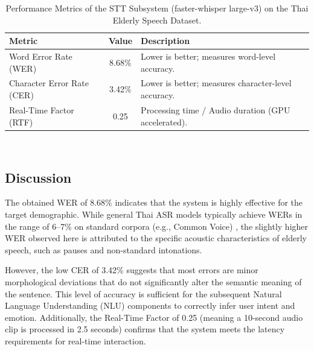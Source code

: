 \begin{table}[ht]
    \centering
    \caption{Performance Metrics of the STT Subsystem (faster-whisper large-v3) on the Thai Elderly Speech Dataset.}
    \label{tab:stt_results}
    \begin{tabular}{|l|c|l|}
        \hline
        \textbf{Metric} & \textbf{Value} & \textbf{Description} \\
        \hline
        Word Error Rate (WER) & 8.68\% & Lower is better; measures word-level accuracy. \\
        \hline
        Character Error Rate (CER) & 3.42\% & Lower is better; measures character-level accuracy. \\
        \hline
        Real-Time Factor (RTF) & 0.25 & Processing time / Audio duration (GPU accelerated). \\
        \hline
    \end{tabular}~
\end{table}

\subsection{Discussion}
The obtained WER of 8.68\% indicates that the system is highly effective for the target demographic. While general Thai ASR models typically achieve WERs in the range of 6--7\% on standard corpora (e.g., Common Voice) \cite{radford2023whisper}, the slightly higher WER observed here is attributed to the specific acoustic characteristics of elderly speech, such as pauses and non-standard intonations.

However, the low CER of 3.42\% suggests that most errors are minor morphological deviations that do not significantly alter the semantic meaning of the sentence. This level of accuracy is sufficient for the subsequent Natural Language Understanding (NLU) components to correctly infer user intent and emotion. Additionally, the Real-Time Factor of 0.25 (meaning a 10-second audio clip is processed in 2.5 seconds) confirms that the system meets the latency requirements for real-time interaction.

